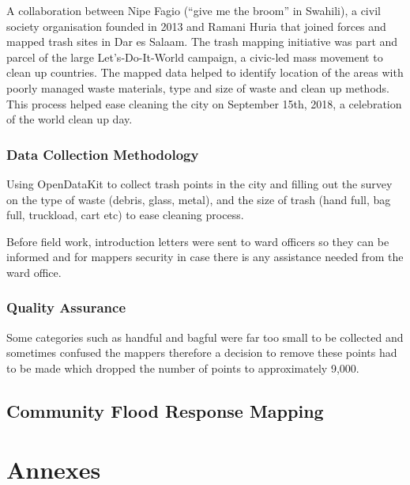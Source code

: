 \documentclass[a4paper,12pt,twoside]{article}
\begin{document}
A collaboration between Nipe Fagio (“give me the broom” in Swahili), a civil society organisation founded in 2013 and Ramani Huria that joined forces and mapped trash sites in Dar es Salaam. The trash mapping initiative was part and parcel of the large Let’s-Do-It-World campaign, a civic-led mass movement to clean up countries.
The mapped data helped to identify location of the areas with poorly managed waste materials, type and size of waste and clean up methods. This process helped ease cleaning the city on September 15th, 2018, a celebration of the world clean up day.

\subsubsection{Data Collection Methodology}
Using OpenDataKit to collect trash points in the city and filling out the survey on the type of waste (debris, glass, metal), and the size of trash (hand full, bag full, truckload, cart etc) to ease cleaning process.

Before field work, introduction letters were sent to ward officers so they can be informed and for mappers security in case there is any assistance needed from the ward office.

\subsubsection{Quality Assurance}
Some categories such as handful and bagful were far too small to be collected and sometimes confused the mappers therefore a decision to remove these points had to be made which dropped the number of points to approximately 9,000.

\newpage
\subsection{Community Flood Response Mapping}

\newpage
\section{Annexes}
\end{document}
